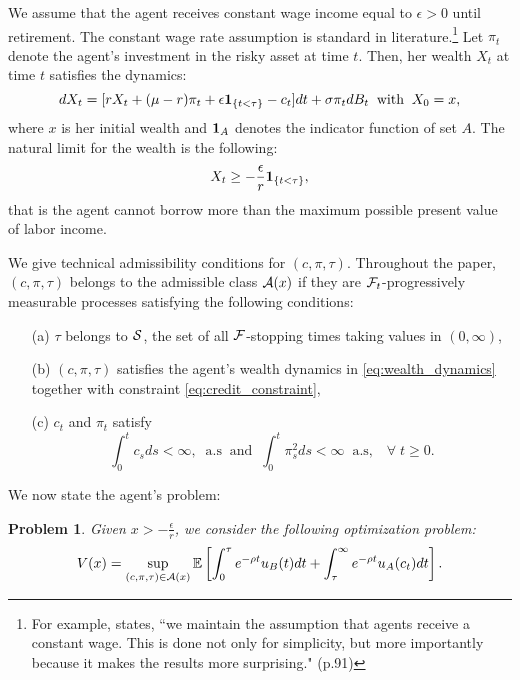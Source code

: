 \documentclass[a4paper,report, 11pt]{article}
\newtheorem{pr}{Problem}
\def\e{\epsilon}
\def\m{\mu}
\def\s{\sigma}
\def\be{\begin{eqnarray}}
\def\ee{\end{eqnarray}}
\begin{document}
We assume that the agent receives constant wage income equal to $\e>0$ until retirement. The constant wage rate assumption is standard in literature.\footnote{For example, \citet{FP2007} states, ``we maintain the assumption that agents receive a constant wage.
	This is done not only for simplicity, but more importantly because it makes the results
	more surprising." (p.91)} Let $\pi_t$ denote the agent's investment in the risky asset at time $t$. Then, 
her wealth $X_t$ at time $t$ satisfies the dynamics:
	\begin{equation}\label{eq:wealth_dynamics}
	dX_t = [r X_t + (\m-r)\pi_t + \e {\bf 1}_{\{t<\tau\}} - c_t]dt + \s \pi_t dB_t \;\;\mbox{with}\;\;X_0=x,
\end{equation}
where $x$ is her initial wealth {and ${\bf 1}_A$ denotes the indicator function of set $A$.  The natural limit for the wealth  is  the following:
\be\label{eq:credit_constraint}
X_t \geq -\frac{\e}{r} {\bf 1}_{\{t< \tau\}},
\ee
that is the agent cannot borrow more than the maximum possible present value of labor income.
}

 {We give technical admissibility conditions for {$(c,\pi,\tau)$}.  Throughout the paper, $(c,\pi,\tau)$ belongs to the admissible class ${\cal A}(x)$ if they are ${\cal F}_t$-progressively measurable processes satisfying the following conditions:
\begin{itemize}
	\item[(a)] $\tau$ belongs to ${\cal S}$,  the set of all ${\cal F}$-stopping times taking values in $(0,\infty)$,
	\item[(b)] $(c,\pi,\tau)$ satisfies the agent's wealth dynamics in \eqref{eq:wealth_dynamics} together with  constraint \eqref{eq:credit_constraint},
	\item[(c)] $c_t$ and  $\pi_t$ satisfy 
	\begin{equation}\label{con:feasible}
	\int_0^t c_s ds <\infty, \;\;\mbox{a.s}\;\;\mbox{and}\;\;\int_0^t \pi_s^2 ds <\infty\;\;\mbox{a.s},\;\;\;\forall\;t\ge 0.
\end{equation}
\end{itemize}
}

We now state the agent's problem:
\begin{pr}\label{pr:optimization_problem} Given $x>-\frac{\e}{r}$, we consider the following optimization problem:
\begin{equation*}
V(x) = \sup_{(c,\pi,\tau)\in{\cal A}(x)} \mathbb{E}\left[\int_0^\tau e^{-\rho t} u_B(t) dt+\int_\tau^\infty e^{-\rho t}u_A(c_t)dt\right]. 
\end{equation*}
\end{pr}
\end{document}

